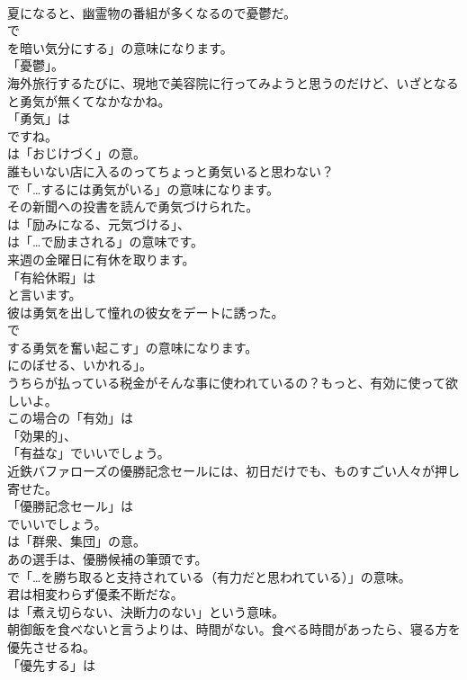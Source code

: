 \documentclass[8pt]{extreport}
\begin{document}
\begin{CJK}{UTF8}{min}
\\	夏になると、幽霊物の番組が多くなるので憂鬱だ。 
\\	で
\\	を暗い気分にする」の意味になります。
\\	「憂鬱」。	
\\	海外旅行するたびに、現地で美容院に行ってみようと思うのだけど、いざとなると勇気が無くてなかなかね。 
\\	「勇気」は
\\	ですね。
\\	は「おじけづく」の意。	
\\	誰もいない店に入るのってちょっと勇気いると思わない？ 
\\	で「…するには勇気がいる」の意味になります。	
\\	その新聞への投書を読んで勇気づけられた。 
\\	は「励みになる、元気づける」、
\\	は「…で励まされる」の意味です。	
\\	来週の金曜日に有休を取ります。 
\\	「有給休暇」は
\\	と言います。	
\\	彼は勇気を出して憧れの彼女をデートに誘った。 
\\	で
\\	する勇気を奮い起こす」の意味になります。
\\	にのぼせる、いかれる」。	
\\	うちらが払っている税金がそんな事に使われているの？もっと、有効に使って欲しいよ。 
\\	この場合の「有効」は
\\	「効果的」、
\\	「有益な」でいいでしょう。	
\\	近鉄バファローズの優勝記念セールには、初日だけでも、ものすごい人々が押し寄せた。 
\\	「優勝記念セール」は 
\\	でいいでしょう。
\\	は「群衆、集団」の意。	
\\	あの選手は、優勝候補の筆頭です。 
\\	で「…を勝ち取ると支持されている（有力だと思われている）」の意味。	
\\	君は相変わらず優柔不断だな。 
\\	は「煮え切らない、決断力のない」という意味。	
\\	朝御飯を食べないと言うよりは、時間がない。食べる時間があったら、寝る方を優先させるね。 
\\	「優先する」は

\end{CJK}
\end{document}
